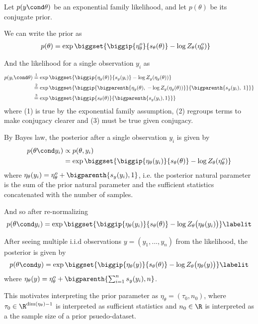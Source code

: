 Let $p(y \cond \theta)$ be an exponential family likelihood, and let $p(\theta)$ be its conjugate prior. 

We can write the prior as 
\begin{align*}
p(\theta ) &= \exp \biggset{\biggip{\eta_\theta^o}{\sufficientStatsFunction_\theta (\theta)} - \log Z_\theta(\eta_\theta^o)} 
\end{align*}

And the likelihood for a single observation $y_i$ as 
\begin{align*}
p(y_i \cond \theta)  & \stackrel{1}{=} \exp \biggset{ \biggip{\eta_y(\theta)}{\sufficientStatsFunction_y(y_i)} - \log Z_y (\eta_y(\theta)) } \\
& \stackrel{2}{=} \exp \biggset{ \biggip{ \bigparenth{\eta_y(\theta), \; - \log Z_y (\eta_y(\theta))}}{\bigparenth{\sufficientStatsFunction_y(y_i), \; 1}}  } \\
& \stackrel{3}{=} \exp \biggset{ \biggip{\sufficientStatsFunction_\theta(\theta)}{\bigparenth{\sufficientStatsFunction_y(y_i),1}}}   
\end{align*}
where (1) is true by the exponential family assumption, (2) regroups terms to make conjugacy clearer and (3) must be true given conjugacy. 


By Bayes law, the posterior after a single observation $y_i$ is given by
\begin{align*}
p(\theta \cond y_i)  &\propto p(\theta, y_i) \\
	&=\exp \biggset{ \biggip{ \eta_\theta(y_i)}{\sufficientStatsFunction_\theta(\theta) } - \log Z_\theta(\eta_\theta^o)} 
\end{align*}
where $\eta_\theta(y_i) = \eta_\theta^o + \bigparenth{\sufficientStatsFunction_y(y_i),1}$, i.e. the posterior natural parameter is the sum of the prior natural parameter and the sufficient statistics concatenated with the number of samples. 

And so after re-normalizing
\begin{align*}
p(\theta \cond y_i)  = \exp \biggset{ \biggip{ \eta_\theta(y_i)}{\sufficientStatsFunction_\theta(\theta) } - \log Z_\theta \big(\eta_\theta(y_i)\big)}
\labelit \label{eqn:posterior_for_exponential_family_after_one_obs} 
\end{align*}
  
After seeing multiple i.i.d observations $y=(y_1,...,y_n)$ from the likelihood, the posterior is given by
\begin{align*}
p(\theta \cond y)  = \exp \biggset{ \biggip{\eta_\theta(y)}{\sufficientStatsFunction_\theta(\theta) } - \log Z_\theta \big(\eta_\theta(y)\big)} 
\labelit \label{eqn:posterior_for_exponential_family_after_many_obs} 
\end{align*}
where $\eta_\theta(y) = \eta_\theta^o + \bigparenth{ \sum_{i=1}^n \sufficientStatsFunction_y(y_i),n}$.

This motivates interpreting the prior parameter as $\eta_\theta = (\tau_0, n_0)$, where $\tau_0 \in \R^{\dim(\eta_\theta) - 1}$ is interpreted as sufficient statistics and $n_0 \in \R$ is interpreted as a the sample size of a prior psuedo-dataset. 
